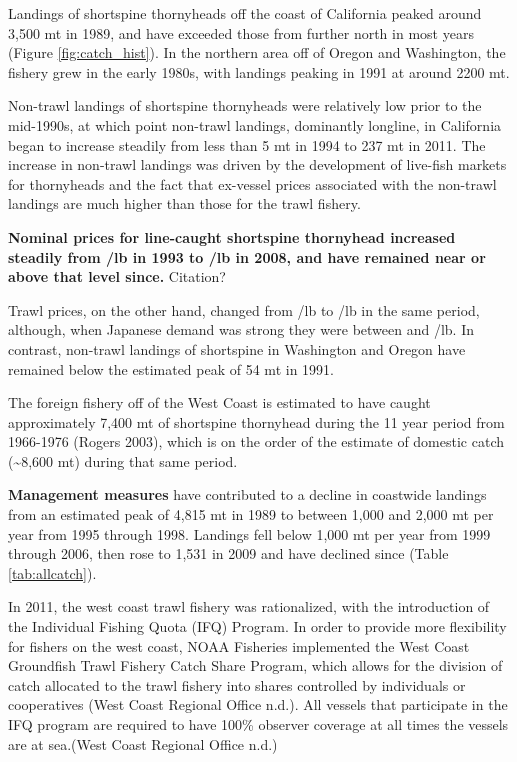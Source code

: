 \documentclass[11pt,
  english,
  letterpaper,
]{article}
\begin{document}
Landings of shortspine thornyheads off the coast of California peaked around 3,500 mt in 1989, and have exceeded those from further north in most years (Figure \ref{fig:catch_hist}). In the northern area off of Oregon and Washington, the fishery grew in the early 1980s, with landings peaking in 1991 at around 2200 mt.

Non-trawl landings of shortspine thornyheads were relatively low prior to the mid-1990s, at which point non-trawl landings, dominantly longline, in California began to increase steadily from less than 5 mt in 1994 to 237 mt in 2011. The increase in non-trawl landings was driven by the development of live-fish markets for thornyheads and the fact that ex-vessel prices associated with the non-trawl landings are much higher than those for the trawl fishery.

\textbf{Nominal prices for line-caught shortspine thornyhead increased steadily from /lb in 1993 to /lb in 2008, and have remained near or above that level since.} Citation?

Trawl prices, on the other hand, changed from /lb to /lb in the same period, although, when Japanese demand was strong they were between  and /lb. In contrast, non-trawl landings of shortspine in Washington and Oregon have remained below the estimated peak of 54 mt in 1991.

The foreign fishery off of the West Coast is estimated to have caught approximately 7,400 mt of shortspine thornyhead during the 11 year period from 1966-1976 (Rogers 2003), which is on the order of the estimate of domestic catch (\textasciitilde8,600 mt) during that same period.

\textbf{Management measures} have contributed to a decline in coastwide landings from an estimated peak of 4,815 mt in 1989 to between 1,000 and 2,000 mt per year from 1995 through 1998. Landings fell below 1,000 mt per year from 1999 through 2006, then rose to 1,531 in 2009 and have declined since (Table \ref{tab:allcatch}).

In 2011, the west coast trawl fishery was rationalized, with the introduction of the Individual Fishing Quota (IFQ) Program. In order to provide more flexibility for fishers on the west coast, NOAA Fisheries implemented the West Coast Groundfish Trawl Fishery Catch Share Program, which allows for the division of catch allocated to the trawl fishery into shares controlled by individuals or cooperatives (West Coast Regional Office n.d.). All vessels that participate in the IFQ program are required to have 100\% observer coverage at all times the vessels are at sea.(West Coast Regional Office n.d.)
\end{document}
